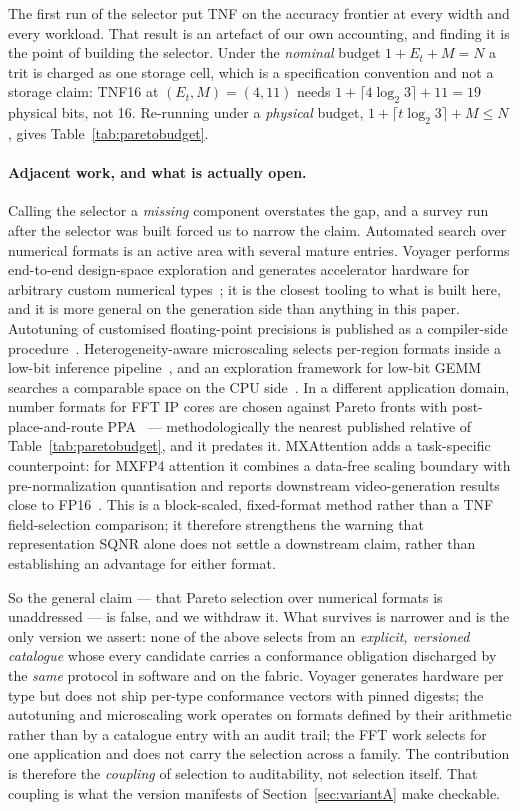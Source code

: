 \documentclass[11pt]{article}
\theoremstyle{definition}
\begin{document}
The first run of the selector put TNF on the accuracy frontier at every width and
every workload. That result is an artefact of our own accounting, and finding it
is the point of building the selector. Under the \emph{nominal} budget
$1 + E_t + M = N$ a trit is charged as one storage cell, which is a specification
convention and not a storage claim: TNF16 at $(E_t,M) = (4,11)$ needs
$1 + \lceil 4\log_2 3\rceil + 11 = 19$ physical bits, not 16. Re-running under a
\emph{physical} budget, $1 + \lceil t\log_2 3\rceil + M \le N$, gives
Table~\ref{tab:paretobudget}.

\paragraph{Adjacent work, and what is actually open.}
Calling the selector a \emph{missing} component overstates the gap, and a survey
run after the selector was built forced us to narrow the claim. Automated search
over numerical formats is an active area with several mature entries. Voyager
performs end-to-end design-space exploration and generates accelerator hardware
for arbitrary custom numerical types~\cite{prabhu2026voyager}; it is the closest
tooling to what is built here, and it is more general on the generation side than
anything in this paper. Autotuning of customised floating-point precisions is
published as a compiler-side procedure~\cite{chen2026autotuning}. Heterogeneity-aware
microscaling selects per-region formats inside a low-bit inference
pipeline~\cite{ada2026mx}, and an exploration framework for low-bit GEMM searches
a comparable space on the CPU side~\cite{exagemm2026}. In a different application
domain, number formats for FFT IP cores are chosen against Pareto fronts with
post-place-and-route PPA~\cite{fftformats2026} --- methodologically the nearest
published relative of Table~\ref{tab:paretobudget}, and it predates it.
MXAttention adds a task-specific counterpoint: for MXFP4 attention it combines a
data-free scaling boundary with pre-normalization quantisation and reports
downstream video-generation results close to FP16~\cite{yu2026mxattention}.
This is a block-scaled, fixed-format method rather than a TNF field-selection
comparison; it therefore strengthens the warning that representation SQNR alone
does not settle a downstream claim, rather than establishing an advantage for
either format.

So the general claim --- that Pareto selection over numerical formats is
unaddressed --- is false, and we withdraw it. What survives is narrower and is the
only version we assert: none of the above selects from an \emph{explicit,
versioned catalogue} whose every candidate carries a conformance obligation
discharged by the \emph{same} protocol in software and on the fabric. Voyager
generates hardware per type but does not ship per-type conformance vectors with
pinned digests; the autotuning and microscaling work operates on formats defined
by their arithmetic rather than by a catalogue entry with an audit trail; the FFT
work selects for one application and does not carry the selection across a family.
The contribution is therefore the \emph{coupling} of selection to auditability, not
selection itself. That coupling is what the version manifests of
Section~\ref{sec:variantA} make checkable.
\end{document}
